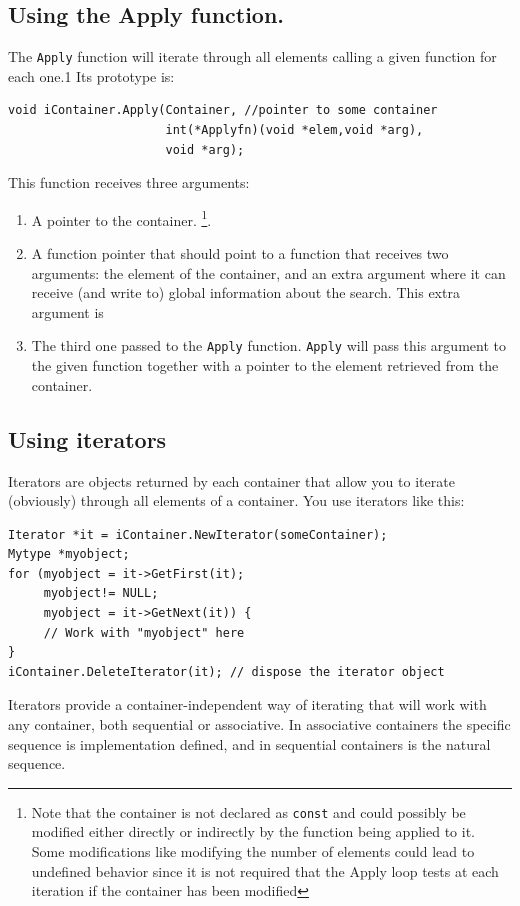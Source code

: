 \documentclass[12pt,a4paper]{memoir} %
\begin{document}
\subsection{Using the Apply function.}
The \verb,Apply, function will iterate through all elements calling a given function for each one.1 Its prototype is:
\begin{verbatim}
void iContainer.Apply(Container, //pointer to some container
                      int(*Applyfn)(void *elem,void *arg),
                      void *arg);
\end{verbatim}
This function receives three arguments:
\begin{enumerate}
\item A pointer to the container. \footnote{Note that the container is not declared as \texttt{const} and could possibly be modified either directly or 
indirectly by the function being applied to it. Some modifications like modifying the number of elements could lead to undefined behavior since it
is not required that the Apply loop tests at each iteration if the container has been modified}.
\item A function pointer that should point to a function that receives two arguments: the element of the container, and an extra argument where it can 
receive (and write to) global information about the search.  This extra argument is 
\item The third one passed to the \verb,Apply, function. \verb,Apply, will pass this argument to the given function together with a pointer to the 
element retrieved from the container.
\end{enumerate}
\subsection{Using iterators}
Iterators are objects returned by each container that allow you to iterate (obviously) through all elements of a container.
You use iterators like this:
\begin{verbatim}
Iterator *it = iContainer.NewIterator(someContainer);
Mytype *myobject;
for (myobject = it->GetFirst(it); 
     myobject!= NULL; 
     myobject = it->GetNext(it)) {
     // Work with "myobject" here
}
iContainer.DeleteIterator(it); // dispose the iterator object
\end{verbatim}
Iterators provide a container-independent way of iterating that will work with any container, both sequential or associative. In associative containers 
the specific sequence is implementation defined, and in sequential containers is the natural sequence.
\end{document}
